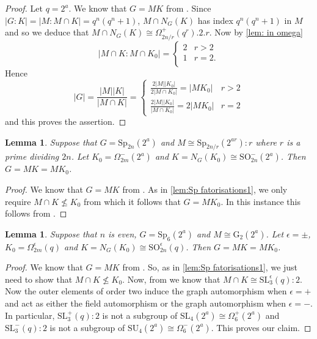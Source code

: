 \documentclass[12pt]{amsart}
\newtheorem{lemma}[theorem]{Lemma}
\theoremstyle{remark}
\theoremstyle{notation}
\theoremstyle{definition}
\newcommand{\SU}{\mathrm{SU}}
\newcommand{\Sp}{\mathrm{Sp}}
\newcommand{\SL}{\mathrm{SL}}
\newcommand{\0}{\emptyset}
\newcommand{\SO}{\mathrm{SO}}
\begin{document}
\begin{proof} Let $q=2^a$. We know that $G=MK$ from \cite{LiebeckPraegerSaxl}. Since $|G:K|=  |M:M\cap K | =q^n(q^n+1)$,  $M \cap N_G(K)$ has index $q^{n}(q^n+1)$ in $M$ and so we deduce that $M\cap N_G(K) \cong \Omega_{2n/r}^+(q^r).2.r $. Now by \cref{lem: in omega} $$|M\cap K:M \cap K_0|= \begin{cases} 2&r>2 \\1&r=2.\\
\end{cases} $$
Hence $$|G|=\frac{|M||K|}{|M \cap K|}= \begin{cases}\frac{2|M||K_0|}{2|M \cap K_0|}= |MK_0|&r>2\\
\frac{2|M||K_0|}{|M \cap K_0|}= 2|MK_0|&r=2
\end{cases}$$
and this proves the assertion.
\end{proof}


  \begin{lemma}\label{lem:More Sp factorisations}
   Suppose that $G=\Sp_{2n}(2^a)$ and $M \cong \Sp_{2n/r}(2^{ar}){:}r$ where $r$ is a prime dividing $2n$. Let $K_0=\Omega_{2m}^-(2^a)$ and $K= N_G(K_0) \cong \SO_{2n}^-(2^a)$. Then $G= MK=MK_0$.
  \end{lemma}

  \begin{proof}
   We know that $G=MK$ from \cite{LiebeckPraegerSaxl}. As in \cref{lem:Sp fatorisations1}, we  only require $M\cap K \not \le K_0$ from which it follows that $G=MK_0$. In this instance this follows from \cite[Proposition 4.3.16 (II)]{KleidmanLiebeck}.
  \end{proof}



  \begin{lemma}\label{lem:G2q factorisations}
  Suppose that $n$ is even, $G=\Sp_{6}(2^a)$ and $M\cong \mathrm G_2(2^a)$. Let $\epsilon  =\pm$, $K_0=\Omega_{2m}^\epsilon(q)$  and $K= N_G(K_0) \cong \SO_{2n}^\epsilon(q)$. Then $G= MK =MK_0$.
  \end{lemma}


  \begin{proof} We know that $G=MK$ from \cite{LiebeckPraegerSaxl}. So, as in \cref{lem:Sp fatorisations1}, we just need to show that $M\cap K \not \le K_0$. Now, from \cite[Subcase 5.2.3 (b)]{LiebeckPraegerSaxl}  we know that $M \cap K \cong \SL_3^\epsilon(q){:}2$.  Now the outer elements of order two induce the graph automorphism when $\epsilon =+$ and act as either the field automorphism or the graph automorphism when $\epsilon = -$.  In particular, $\SL_3^+(q){:}2$ is not a subgroup of $\SL_4(2^a)\cong \Omega_6^+(2^a)$ and $\SL_3^-(q){:}2$ is not a subgroup of $\SU_4(2^a)\cong \Omega_6^-(2^a)$.  This proves our claim.
  \end{proof}
\end{document}
